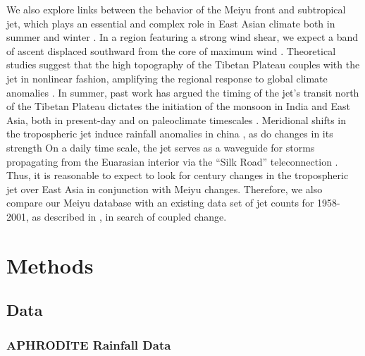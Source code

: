 \documentclass[draft,grl]{AGUTeX}
\begin{document}
\begin{article}
	We also explore links between the behavior of the Meiyu front and subtropical jet, which plays an essential and complex role in East Asian climate both in summer and winter \citep{Yang2002}. In a region featuring a strong wind shear, we expect a band of ascent displaced southward from the core of maximum wind \citep{Holton2004}. Theoretical studies suggest that the high topography of the Tibetan Plateau couples with the jet in nonlinear fashion, amplifying the regional response to global climate anomalies \citep{Nigam1989,Broccoli1992,Park1997}. In summer, past work has argued the timing of the jet's transit north of the Tibetan Plateau dictates the initiation of the monsoon in India and East Asia, both in present-day \citep{Yin1949,Hahn1975,Yeh1959} and on paleoclimate timescales \citep{Chiang 2015}. Meridional shifts in the tropospheric jet induce rainfall anomalies in china \citep{Liang1998}, as do changes in its strength \citep{Kwon2007,Du2009,Li2014} On a daily time scale, the jet serves as a waveguide for storms propagating from the Euarasian interior via the ``Silk Road'' teleconnection \citep{Hoskins1993,Ambrizzi1997,Kosaka2012}. Thus, it is reasonable to expect to look for  century changes in the tropospheric jet over East Asia in conjunction with Meiyu changes. Therefore, we also compare our Meiyu database with an existing data set of jet counts for 1958-2001, as described in \citet{Schiemann2009}, in search of coupled change.
	
\section{Methods}

\subsection{Data}

\subsubsection{APHRODITE Rainfall Data}


\end{article}
\end{document}
